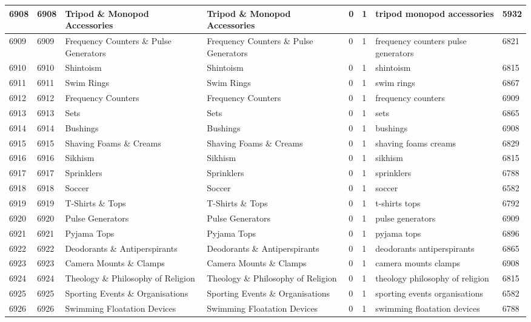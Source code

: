 \begin{longtable}{|l|l|l|l|l|l|l|l|}
6908 & 6908 & Tripod \& Monopod Accessories & Tripod \& Monopod Accessories & 0 & 1 & tripod monopod accessories & 5932 \\ \hline 
6909 & 6909 & Frequency Counters \& Pulse Generators & Frequency Counters \& Pulse Generators & 0 & 1 & frequency counters pulse generators & 6821 \\ \hline 
6910 & 6910 & Shintoism & Shintoism & 0 & 1 & shintoism & 6815 \\ \hline 
6911 & 6911 & Swim Rings & Swim Rings & 0 & 1 & swim rings & 6867 \\ \hline 
6912 & 6912 & Frequency Counters & Frequency Counters & 0 & 1 & frequency counters & 6909 \\ \hline 
6913 & 6913 & Sets & Sets & 0 & 1 & sets & 6865 \\ \hline 
6914 & 6914 & Bushings & Bushings & 0 & 1 & bushings & 6908 \\ \hline 
6915 & 6915 & Shaving Foams \& Creams & Shaving Foams \& Creams & 0 & 1 & shaving foams creams & 6829 \\ \hline 
6916 & 6916 & Sikhism & Sikhism & 0 & 1 & sikhism & 6815 \\ \hline 
6917 & 6917 & Sprinklers & Sprinklers & 0 & 1 & sprinklers & 6788 \\ \hline 
6918 & 6918 & Soccer & Soccer & 0 & 1 & soccer & 6582 \\ \hline 
6919 & 6919 & T-Shirts \& Tops & T-Shirts \& Tops & 0 & 1 & t-shirts tops & 6792 \\ \hline 
6920 & 6920 & Pulse Generators & Pulse Generators & 0 & 1 & pulse generators & 6909 \\ \hline 
6921 & 6921 & Pyjama Tops & Pyjama Tops & 0 & 1 & pyjama tops & 6896 \\ \hline 
6922 & 6922 & Deodorants \& Antiperspirants & Deodorants \& Antiperspirants & 0 & 1 & deodorants antiperspirants & 6865 \\ \hline 
6923 & 6923 & Camera Mounts \& Clamps & Camera Mounts \& Clamps & 0 & 1 & camera mounts clamps & 6908 \\ \hline 
6924 & 6924 & Theology \& Philosophy of Religion & Theology \& Philosophy of Religion & 0 & 1 & theology philosophy of religion & 6815 \\ \hline 
6925 & 6925 & Sporting Events \& Organisations & Sporting Events \& Organisations & 0 & 1 & sporting events organisations & 6582 \\ \hline 
6926 & 6926 & Swimming Floatation Devices & Swimming Floatation Devices & 0 & 1 & swimming floatation devices & 6788 \\ \hline 

\end{longtable}
